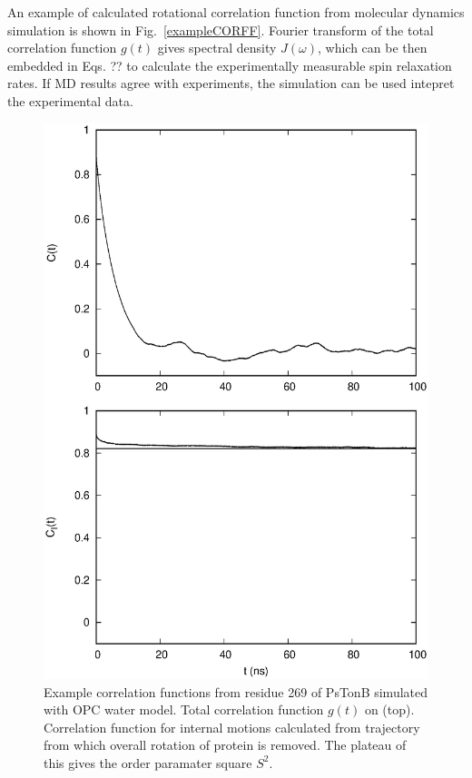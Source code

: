 \documentclass[pre,aps,floatfix,authordate1-4,twocolumn]{revtex4-1}
\begin{document}
An example of calculated rotational correlation function from
molecular dynamics simulation is shown in Fig.~\ref{exampleCORFF}.
Fourier transform of the total correlation function $g(t)$ gives
spectral density $J(\omega)$, which can be then embedded in Eqs. ??
to calculate the experimentally measurable spin relaxation rates.
If MD results agree with experiments, the simulation can be used
intepret the experimental data.
\begin{figure}[!h]
  \includegraphics[width=13cm]{../Figs/exampleCORRF.eps}%
  \caption{Example correlation functions from residue 269 of PsTonB simulated with OPC water model.
    Total correlation function $g(t)$ on (top). Correlation function for internal motions
    calculated from trajectory from which overall rotation of protein is removed.
    The plateau of this gives the order paramater square $S^2$.
    \label{exampleCORRF}}%
\end{figure}
\end{document}
